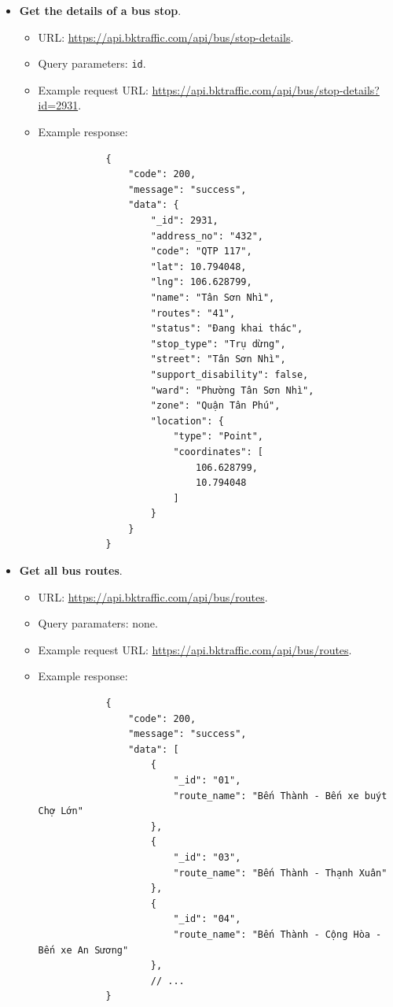 \begin{itemize}
    \item \textbf{Get the details of a bus stop}.
    \begin{itemize}
        \item URL: \url{https://api.bktraffic.com/api/bus/stop-details}.
        \item Query parameters: \lstinline{id}.
        \item Example request URL: \url{https://api.bktraffic.com/api/bus/stop-details?id=2931}.
        \item Example response:
        \begin{lstlisting}
            {
                "code": 200,
                "message": "success",
                "data": {
                    "_id": 2931,
                    "address_no": "432",
                    "code": "QTP 117",
                    "lat": 10.794048,
                    "lng": 106.628799,
                    "name": "Tân Sơn Nhì",
                    "routes": "41",
                    "status": "Đang khai thác",
                    "stop_type": "Trụ dừng",
                    "street": "Tân Sơn Nhì",
                    "support_disability": false,
                    "ward": "Phường Tân Sơn Nhì",
                    "zone": "Quận Tân Phú",
                    "location": {
                        "type": "Point",
                        "coordinates": [
                            106.628799,
                            10.794048
                        ]
                    }
                }
            }
        \end{lstlisting}
    \end{itemize}

    \item \textbf{Get all bus routes}.
    \begin{itemize}
        \item URL: \url{https://api.bktraffic.com/api/bus/routes}.
        \item Query paramaters: none.
        \item Example request URL: \url{https://api.bktraffic.com/api/bus/routes}.
        \item Example response:
        \begin{lstlisting}
            {
                "code": 200,
                "message": "success",
                "data": [
                    {
                        "_id": "01",
                        "route_name": "Bến Thành - Bến xe buýt Chợ Lớn"
                    },
                    {
                        "_id": "03",
                        "route_name": "Bến Thành - Thạnh Xuân"
                    },
                    {
                        "_id": "04",
                        "route_name": "Bến Thành - Cộng Hòa - Bến xe An Sương"
                    },
                    // ... 
            }
        \end{lstlisting}
    \end{itemize}


\end{itemize}
